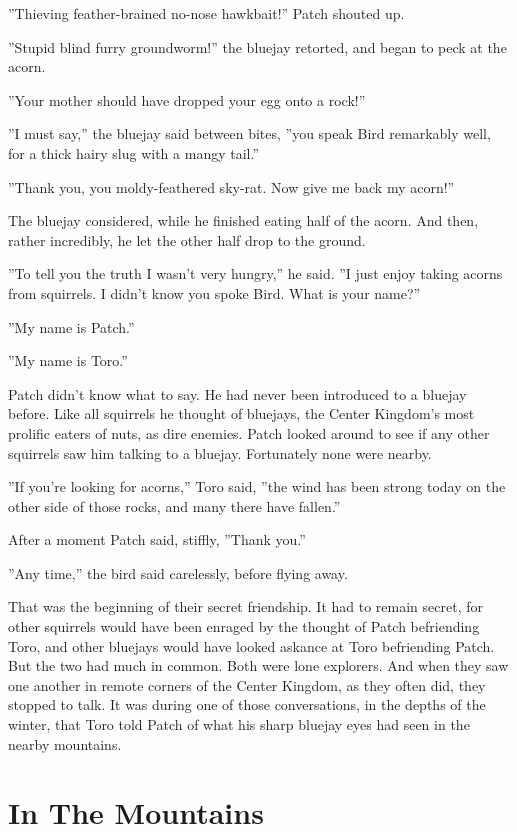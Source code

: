 \documentclass[12pt]{book}
\begin{document}
''Thieving feather-brained no-nose hawkbait!'' Patch shouted up.

''Stupid blind furry groundworm!'' the bluejay retorted, and began to
peck at the acorn.

''Your mother should have dropped your egg onto a rock!''

''I must say,'' the bluejay said between bites, ''you speak Bird
remarkably well, for a thick hairy slug with a mangy tail.''

''Thank you, you moldy-feathered sky-rat. Now give me back my acorn!''

The bluejay considered, while he finished eating half of the
acorn. And then, rather incredibly, he let the other half drop to the
ground.

''To tell you the truth I wasn't very hungry,'' he said. ''I just
enjoy taking acorns from squirrels. I didn't know you spoke Bird. What
is your name?''

''My name is Patch.''

''My name is Toro.''

Patch didn't know what to say. He had never been introduced to a
bluejay before. Like all squirrels he thought of bluejays, the Center
Kingdom's most prolific eaters of nuts, as dire enemies. Patch looked
around to see if any other squirrels saw him talking to a
bluejay. Fortunately none were nearby.

''If you're looking for acorns,'' Toro said, ''the wind has been
strong today on the other side of those rocks, and many there have
fallen.''

After a moment Patch said, stiffly, ''Thank you.''

''Any time,'' the bird said carelessly, before flying away.

That was the beginning of their secret friendship. It had to remain
secret, for other squirrels would have been enraged by the thought of
Patch befriending Toro, and other bluejays would have looked askance
at Toro befriending Patch. But the two had much in common. Both were
lone explorers. And when they saw one another in remote corners of the
Center Kingdom, as they often did, they stopped to talk. It was during
one of those conversations, in the depths of the winter, that Toro
told Patch of what his sharp bluejay eyes had seen in the nearby
mountains.


\section{In The Mountains}
\end{document}
